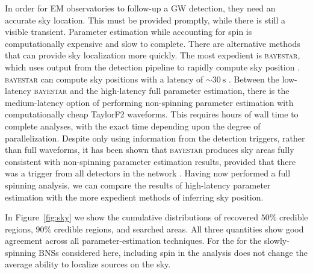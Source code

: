 In order for EM observatories to follow-up a GW detection, they need an accurate sky location. This must be provided promptly, while there is still a visible transient. Parameter estimation while accounting for spin is computationally expensive and slow to complete. There are alternative methods that can provide sky localization more quickly. The most expedient is \textsc{bayestar}, which uses output from the detection pipeline to rapidly compute sky position \citep{Singer_2014}. \textsc{bayestar} can compute sky positions with a latency of $\sim30~\mathrm{s}$ \citep{Berry_2014}. Between the low-latency \textsc{bayestar} and the high-latency full parameter estimation, there is the medium-latency option of performing non-spinning parameter estimation with computationally cheap TaylorF2 waveforms. This requires hours of wall time to complete analyses, with the exact time depending upon the degree of parallelization. Despite only using information from the detection triggers, rather than full waveforms, it has been shown that \textsc{bayestar} produces sky areas fully consistent with non-spinning parameter estimation results, provided that there was a trigger from all detectors in the network \citep{Singer_2014,Berry_2014}. Having now performed a full spinning analysis, we can compare the results of high-latency parameter estimation with the more expedient methods of inferring sky position.

In Figure~\ref{fig:sky} we show the cumulative distributions of recovered $50\%$ credible regions, $90\%$ credible regions, and searched areas. All three quantities show good agreement across all parameter-estimation techniques. %
For the for the slowly-spinning BNSs considered here, including spin in the analysis does not change the average ability to localize sources on the sky.

  
  
  
  
  
  
  
  
  